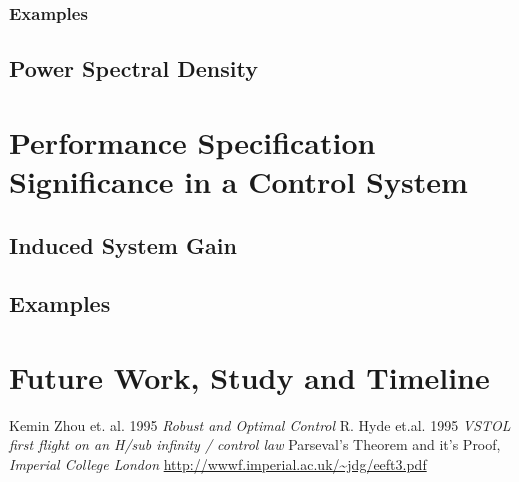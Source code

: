 \documentclass[a4paper,12pt]{article}
\begin{document}
		\subsubsection{Examples}
	\subsection{Power Spectral Density}
\section{Performance Specification Significance in a Control System}
	\subsection{Induced System Gain}
	\subsection{Examples}
\section{Future Work, Study and Timeline}
\begin{thebibliography}{20}

 Kemin Zhou et. al. 1995 \emph{Robust and Optimal Control}
 R. Hyde et.al. 1995 \emph{VSTOL first flight on an H/sub infinity / control law}
 Parseval's Theorem and it's Proof, \emph{Imperial College London} \url{http://wwwf.imperial.ac.uk/~jdg/eeft3.pdf}
\end{thebibliography}
\end{document}
